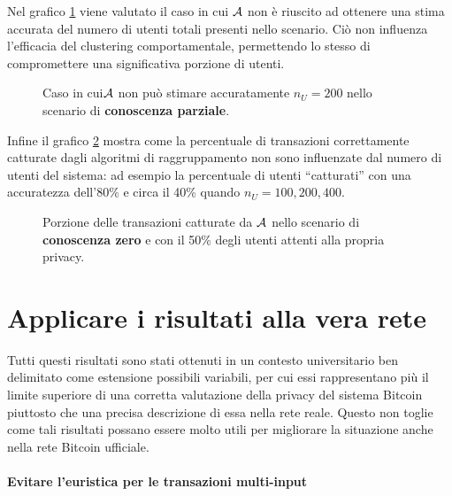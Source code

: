 Nel grafico \ref{userprivacy_fig_3} viene valutato il caso in cui $\mathcal{A}$ non è riuscito ad ottenere una stima accurata del numero di utenti totali presenti nello scenario. Ciò non influenza l'efficacia del clustering comportamentale, permettendo lo stesso di compromettere una significativa porzione di utenti.

\begin{figure}[htbp]
\centering
\caption{Caso in cui$\mathcal{A}$ non può stimare accuratamente $n_U = 200$ nello scenario di \textbf{conoscenza parziale}.\label{userprivacy_fig_3}}
\end{figure}

Infine il grafico \ref{userprivacy_fig_5} mostra come la percentuale di transazioni correttamente catturate dagli algoritmi di raggruppamento non sono influenzate dal numero di utenti del sistema: ad esempio la percentuale di utenti ``catturati'' con una accuratezza dell'80\% e circa il 40\% quando $n_U = 100, 200, 400$.

\begin{figure}[htbp]
\centering
\caption{Porzione delle transazioni catturate da $\mathcal{A}$ nello scenario di \textbf{conoscenza zero} e con il 50\% degli utenti attenti alla propria privacy.\label{userprivacy_fig_5}}
\end{figure}

\section{Applicare i risultati alla vera rete}

Tutti questi risultati sono stati ottenuti in un contesto universitario ben delimitato come estensione possibili variabili, per cui essi rappresentano più il limite superiore di una corretta valutazione della privacy del sistema Bitcoin piuttosto che una precisa descrizione di essa nella rete reale. Questo non toglie come tali risultati possano essere molto utili per migliorare la situazione anche nella rete Bitcoin ufficiale.

\paragraph{Evitare l'euristica per le transazioni multi-input}

